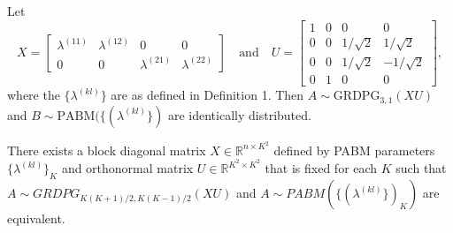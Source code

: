 \documentclass[12pt]{article}
\begin{document}
\begin{theorem}[Connecting the PABM to the GRDPG for $K = 2$]
\label{theorem1}
Let
$$X = \begin{bmatrix}
\lambda^{(11)} & \lambda^{(12)} & 0 & 0 \\
0 & 0 & \lambda^{(21)} & \lambda^{(22)}
\end{bmatrix} \quad \text{and} \quad
U = \begin{bmatrix} 1 & 0 & 0 & 0 \\
0 & 0 & 1 / \sqrt{2} & 1 / \sqrt{2} \\
0 & 0 & 1 / \sqrt{2} & - 1 / \sqrt{2} \\
0 & 1 & 0 & 0 \end{bmatrix},$$
where the $\{\lambda^{(kl)}\}$ are as defined in Definition 1.
Then $A \sim \mathrm{GRDPG}_{3, 1}(X U)$ and $B \sim \mathrm{PABM}(\{(\lambda^{(kl)}\})$ are
identically distributed.
\end{theorem}

\begin{theorem}[Generalization to $K > 2$]
\label{theorem2}
There exists a block diagonal matrix
$X \in \mathbb{R}^{n \times K^2}$ defined by PABM parameters
$\{\lambda^{(kl)}\}_K$ and orthonormal matrix
$U \in \mathbb{R}^{K^2 \times K^2}$ that is fixed
for each $K$ such that $A \sim GRDPG_{K (K+1) / 2, K (K-1) / 2}(XU)$ and
$A \sim PABM(\{(\lambda^{(kl)}\})_K)$ are equivalent.
\end{theorem}
\end{document}
